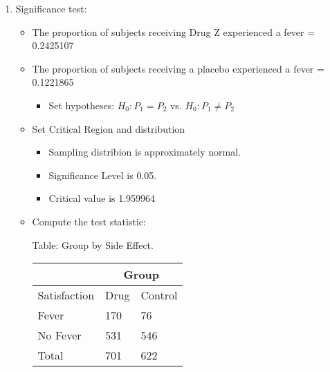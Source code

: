 \documentclass[11pt]{book}\usepackage[]{graphicx}\usepackage[]{color}
\begin{document}
\begin{exercises}
\begin{exercise}
\end{exercise}
\vspace{2mm}
\begin{solution}

\par\nobreak\vspace{\baselineskip}

  \begin{enumerate}
	 \item Significance test:


\begin{itemize}

\item The proportion of subjects receiving Drug Z experienced a fever = 0.2425107
\item The proportion of subjects receiving a placebo experienced a fever = 0.1221865
  \begin{itemize}
  \item Set hypotheses: $H_0: P_1 = P_2$ vs. $H_0: P_1 \ne P_2$
  \end{itemize}

\item Set Critical Region and distribution

  \begin{itemize}
  \item Sampling distribion is approximately normal.
  \item Significance Level is 0.05.
  \item Critical value is 1.959964
  \end{itemize}

\item Compute the test statistic:

\begin{minipage}[h]{6cm}

Table: Group  by Side Effect.

      \begin{tabular}{@{} p{2.5cm} p{1cm} p{1cm} @{}} \hline %
     &  \multicolumn{2}{c}{Group } \\ \hline
     Satisfaction   & Drug & Control \\ \hline
     Fever             & 170 & 76 \\
     No Fever          & 531 & 546 \\ \hline
     Total             & 701 & 622 \\ \hline
   \end{tabular}


\end{minipage}
\end{itemize}
\end{enumerate}
\end{solution}
\end{exercises}
\end{document}
